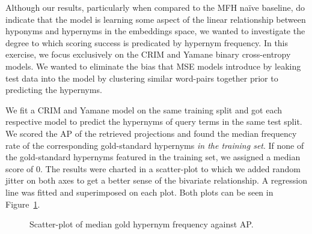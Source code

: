 Although our results, particularly when compared to the \ac{MFH} na\"ive baseline, do indicate that the model is learning some aspect of the linear relationship between hyponyms and hypernyms in the embeddings space, we wanted to investigate the degree to which scoring success is predicated by hypernym frequency.  In this exercise, we focus exclusively on the CRIM and Yamane binary cross-entropy models.  We wanted to eliminate the bias that \ac{MSE} models introduce by leaking test data into the model by clustering similar word-pairs together prior to predicting the hypernyms.

We fit a CRIM and Yamane model on the same training split and got each respective model to predict the hypernyms of query terms in the same test split.  We scored the \ac{AP} of the retrieved projections and found the median frequency rate of the corresponding gold-standard hypernyms \textit{in the training set}.  If none of the gold-standard hypernyms featured in the training set, we assigned a median score of 0. The results were charted in a scatter-plot to which we added random jitter on both axes to get a better sense of the bivariate relationship.  A regression line was fitted and superimposed on each plot.  Both plots can be seen in Figure~\ref{fig:scatter_crim_yamane}.
\begin{figure}[!ht]
    \centering
    \qquad
    \caption{Scatter-plot of median gold hypernym frequency against \ac{AP}.}        
    \label{fig:scatter_crim_yamane}
\end{figure}

